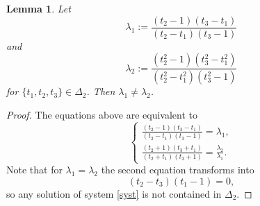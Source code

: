 \documentclass{article}
\newtheorem{lem}[thm]{Lemma}
\numberwithin{equation}{section}
\begin{document}


\begin{lem}\label{difflambdas}
    Let $$\lambda_1 := \frac{(t_2 - 1)(t_3 - t_1)}{(t_2 - t_1)(t_3 - 1)}$$ and $$\lambda_2 := 
        \frac{(t_2^2 - 1)(t_3^2 - t_1^2)}{(t_2^2 - t_1^2)(t_3^2 - 1)}$$ for $\{t_1,t_2,t_3\} \in \Delta_2$. Then $\lambda_1 \neq \lambda_2$.
\end{lem}

\begin{proof}
    The equations above are equivalent to  $$\begin{cases}\label{syst}
        \frac{(t_2 - 1)(t_3 - t_1)}{(t_2 - t_1)(t_3 - 1)} = \lambda_1, \\
        \frac{(t_2 + 1)(t_3 + t_1)}{(t_2 + t_1)(t_3 + 1)} = \frac{\lambda_2}{\lambda_1}.
    \end{cases}$$
    Note that for $\lambda_1 = \lambda_2$ the second equation transforms into $$(t_2 - t_3)(t_1 - 1) = 0,$$ so any solution of system \ref{syst} is not contained in $\Delta_2$.

    
    

   
\end{proof}
\end{document}
